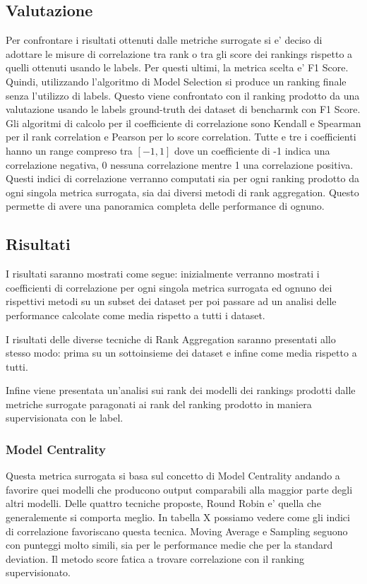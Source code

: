 \subsection{Valutazione}
Per confrontare i risultati ottenuti dalle metriche surrogate si e' deciso di adottare le misure di correlazione tra rank o tra gli score dei rankings rispetto a quelli ottenuti usando le labels. Per questi ultimi, la metrica scelta e' F1 Score.
Quindi, utilizzando l'algoritmo di Model Selection si produce un ranking finale senza l'utilizzo di labels. Questo viene confrontato con il ranking prodotto  da una valutazione usando le labels ground-truth dei dataset di bencharmk con F1 Score.
Gli algoritmi di calcolo per il coefficiente di correlazione sono Kendall e Spearman per il rank correlation e Pearson per lo score correlation. Tutte e tre i coefficienti hanno un range compreso tra $[-1,1]$ dove un coefficiente di -1 indica una correlazione negativa, 0 nessuna correlazione mentre 1 una correlazione positiva.
Questi indici di correlazione verranno computati sia per ogni ranking prodotto da ogni singola metrica surrogata, sia dai diversi metodi di rank aggregation. Questo permette di avere una panoramica completa delle performance di ognuno.





\subsection{Risultati}
I risultati saranno mostrati come segue: inizialmente verranno mostrati i coefficienti di correlazione per ogni singola metrica surrogata ed ognuno dei rispettivi metodi su un subset dei dataset per poi passare ad un analisi delle performance calcolate come media rispetto a tutti i dataset.

I risultati delle diverse tecniche di Rank Aggregation saranno presentati allo stesso modo: prima su un sottoinsieme dei dataset e infine come media rispetto a tutti.

Infine viene presentata un'analisi sui rank dei modelli dei rankings prodotti dalle metriche surrogate paragonati ai rank del ranking prodotto in maniera supervisionata con le label.
\subsubsection{Model Centrality}
Questa metrica surrogata si basa sul concetto di Model Centrality andando a favorire quei modelli che producono output comparabili alla maggior parte degli altri modelli. Delle quattro tecniche proposte, Round Robin e' quella che generalemente si comporta meglio. In tabella X possiamo vedere come gli indici di correlazione favoriscano questa tecnica.
Moving Average e Sampling seguono con punteggi molto simili, sia per le performance medie che per la standard deviation. Il metodo score fatica a trovare correlazione con il ranking supervisionato. 

